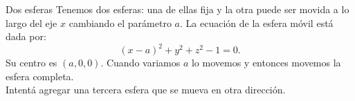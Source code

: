 \begin{surferPage}{Dos esferas}
Tenemos dos esferas: una de ellas fija y la otra puede ser movida a lo largo del eje $x$ cambiando el par\'ametro $a$. La ecuaci\'on de la esfera m\'ovil est\'a dada por:
\[(x-a)^2+y^2+z^2-1=0.\]
Su centro es $(a,0,0)$. Cuando variamos $a$ lo movemos y entonces movemos la esfera completa.\\

Intent\'a agregar una tercera esfera que se mueva en otra direcci\'on.
\end{surferPage}
